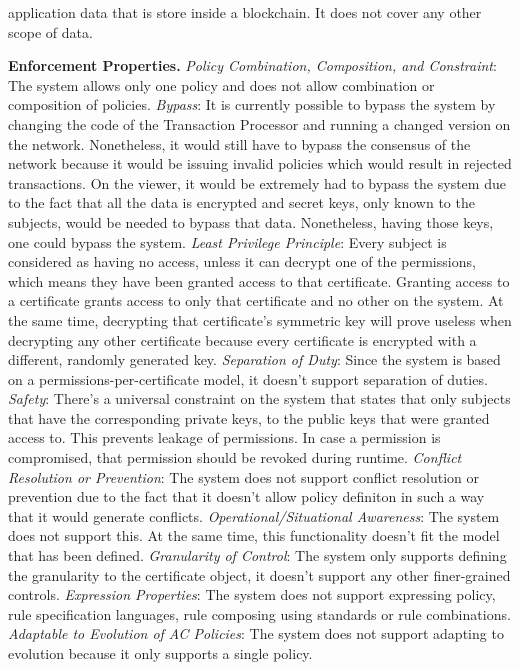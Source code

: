 application data that is store inside a blockchain. It does not cover any other scope of data.

\textbf{Enforcement Properties.} \emph{Policy Combination, Composition, and Constraint}: The system allows only one policy and does not allow combination or composition of policies. \emph{Bypass}: It is currently possible to bypass the system by changing the code of the Transaction Processor and running a changed version on the network. Nonetheless, it would still have to bypass the consensus of the network because it would be issuing invalid policies which would result in rejected transactions. On the viewer, it would be extremely had to bypass the system due to the fact that all the data is encrypted and secret keys, only known to the subjects, would be needed to bypass that data. Nonetheless, having those keys, one could bypass the system. \emph{Least Privilege Principle}: Every subject is considered as having no access, unless it can decrypt one of the permissions, which means they have been granted access to that certificate. Granting access to a certificate grants access to only that certificate and no other on the system. At the same time, decrypting that certificate's symmetric key will prove useless when decrypting any other certificate because every certificate is encrypted with a different, randomly generated key. \emph{Separation of Duty}: Since the system is based on a permissions-per-certificate model, it doesn't support separation of duties. \emph{Safety}: There's a universal constraint on the system that states that only subjects that have the corresponding private keys, to the public keys that were granted access to. This prevents leakage of permissions. In case a permission is compromised, that permission should be revoked during runtime. \emph{Conflict Resolution or Prevention}: The system does not support conflict resolution or prevention due to the fact that it doesn't allow policy definiton in such a way that it would generate conflicts. \emph{Operational/Situational Awareness}: The system does not support this. At the same time, this functionality doesn't fit the model that has been defined. \emph{Granularity of Control}: The system only supports defining the granularity to the certificate object, it doesn't support any other finer-grained controls. \emph{Expression Properties}: The system does not support expressing policy, rule specification languages, rule composing using standards or rule combinations. \emph{Adaptable to Evolution of AC Policies}: The system does not support adapting to evolution because it only supports a single policy.


